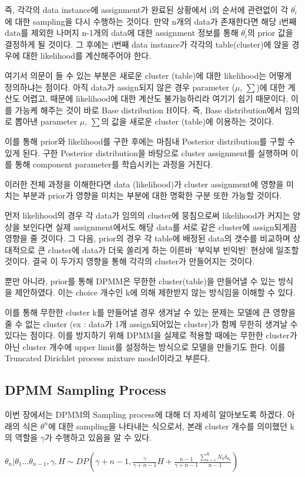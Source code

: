 \documentclass[a4paper]{oblivoir}
\begin{document}
즉, 각각의 data instance에 assignment가 완료된 상황에서 i의 순서에 관련없이 각 $\theta^{'}_{i}$에 대한 sampling을 다시 수행하는 것이다. 만약 n개의 data가 존재한다면 해당 i번째 data를 제외한 나머지 n-1개의 data에 대한 assignment 정보를 통해 $\theta^{'}_{i}$의 prior 값을 결정하게 될 것이다. 그 후에는 i번째 data instance가 각각의 table(cluster)에 앉을 경우에 대한 likelihood를 계산해주어야 한다. 

여기서 의문이 들 수 있는 부분은 새로운 cluster (table)에 대한 likelihood는 어떻게 정의하냐는 점이다. 아직 data가 assign되지 않은 경우 parameter ($\mu$, $\sum$)에 대한 계산도 어렵고, 때문에 likelihood에 대한 계산도 불가능하리라 여기기 쉽기 때문이다. 이를 가능케 해주는 것이 바로 Base distribution H이다. 즉, Base distribution에서 임의로 뽑아낸 parameter $\mu$, $\sum$의 값을 새로운 cluster (table)에 이용하는 것이다. 

이를 통해 prior와 likelihood를 구한 후에는 마침내 Posterior distribution를 구할 수 있게 된다. 구한 Posterior distribution을 바탕으로 cluster assignment를 실행하며 이를 통해 component parameter를 학습시키는 과정을 거친다. 

이러한 전체 과정을 이해한다면  data (likelihood)가 cluster assignment에 영향을 미치는 부분과 prior가 영향을 미치는 부분에 대한 명확한 구분 또한 가능할 것이다.

먼저 likelihood의 경우 각 data가 임의의 cluster에 뭉침으로써 likelihood가 커지는 양상을 보인다면 실제 assignment에서도 해당 data를 서로 같은 cluster에 assign되게끔 영향을 줄 것이다. 그 다음, prior의 경우 각 table에 배정된 data의 갯수를 비교하며 상대적으로 큰 cluster에 data가 더욱 쏠리게 하는 이른바 '부익부 빈익빈' 현상에 일조할 것이다. 결국 이 두가지 영향을 통해 각각의 cluster가 만들어지는 것이다. 

뿐만 아니라, prior를 통해 DPMM은 무한한 cluster(table)을 만들어낼 수 있는 방식을 제안하였다. 이는 choice 개수인 k에 의해 제한받지 않는 방식임을 이해할 수 있다. 

이를 통해 무한한 cluster k를 만들어낼 경우 생겨날 수 있는 문제는 모델에 큰 영향을 줄 수 없는 cluster (ex : data가 1개 assign되어있는 cluster)가 함께 무한히 생겨날 수 있다는 점이다. 
이를 방지하기 위해 DPMM을 실제로 적용할 때에는 무한한 cluster가 아닌 cluster 개수에 upper limit를 설정하는 방식으로 모델을 만들기도 한다. 이를 Truncated Dirichlet process mixture model이라고 부른다. 


\newpage
\subsection{DPMM Sampling Process}
이번 장에서는 DPMM의 Sampling process에 대해 더 자세히 알아보도록 하겠다. 아래의 식은 $\theta^{n}$에 대한 sampling을 나타내는 식으로서, 본래 cluster 개수를 의미했던 k의 역할을  $\gamma$가 수행하고 있음을 알 수 있다.
\begin{center}
$\theta_{n}|\theta_{1}...\theta_{n-1},\gamma,H \sim DP(\gamma+n-1,\frac{\gamma}{\gamma+n-1}H + \frac{n-1}{\gamma+n-1}\frac{\sum^{K}_{k=1}N_{k}\delta_{\theta_{k}}}{n-1})$
\end{center}
\end{document}
